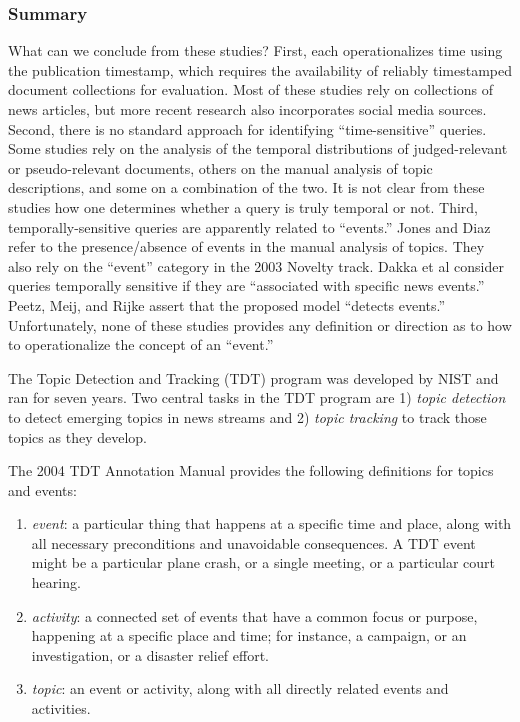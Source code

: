 \documentclass{sig-alternate}
\begin{document}
\subsubsection{Summary}

What can we conclude from these studies? First, each operationalizes time using the publication timestamp, which requires the availability of reliably timestamped document collections for evaluation. Most of these studies rely on collections of news articles, but more recent research also incorporates social media sources. Second, there is no standard approach for identifying ``time-sensitive'' queries. Some studies rely on the analysis of the temporal distributions of judged-relevant or pseudo-relevant documents, others on the manual analysis of topic descriptions, and some on a combination of the two. It is not clear from these studies how one determines whether a query is truly temporal or not. Third, temporally-sensitive queries are apparently related to ``events.'' Jones and Diaz refer to the presence/absence of events in the manual analysis of topics. They also rely on the ``event'' category in the 2003 Novelty track. Dakka et al consider queries temporally sensitive if they are ``associated with specific news events.''  Peetz, Meij, and Rijke assert that the proposed model ``detects events.''  Unfortunately, none of these studies provides any definition or direction as to how to operationalize the concept of an ``event.''

The Topic Detection and Tracking (TDT) program was developed by NIST and ran for seven years. Two central tasks in the TDT program are 1) \emph{topic detection} to detect emerging topics in news streams and 2) \emph{topic tracking} to track those topics as they develop. 

The 2004 TDT Annotation Manual provides the following definitions for topics and events:

\begin{enumerate}
\item \emph{event}:  a particular thing that happens at a specific time and place, along with all necessary preconditions and unavoidable consequences. A
TDT event might be a particular plane crash, or a single meeting, or a particular court hearing. 
\item \emph{activity}:  a connected set of events that have a common focus or purpose, happening at a specific place and time; for instance, a
campaign, or an investigation, or a disaster relief effort. 
\item \emph{topic}: an event or activity, along with all directly related events and activities. 
\end{enumerate}
\end{document}
